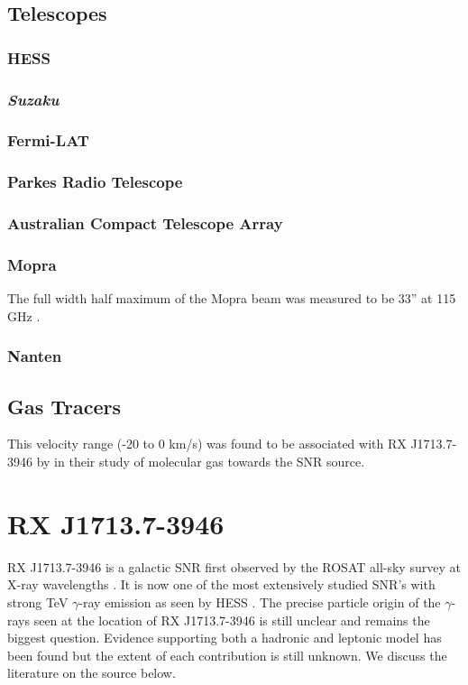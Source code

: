\documentclass[12pt,a4paper]{article}
\begin{document}
\subsection{Telescopes}
\subsubsection{HESS}
\subsubsection{\textbf{\textit{Suzaku}}}
\subsubsection{Fermi-LAT}
\subsubsection{Parkes Radio Telescope}
\subsubsection{Australian Compact Telescope Array}
\subsubsection{Mopra}
The full width half maximum of the Mopra beam was measured to be 33'' at 115 GHz \citep{2005PASA...22...62L}.
\subsubsection{Nanten}

\subsection{Gas Tracers}
This velocity range (-20 to 0 km/s) was found to be associated with RX J1713.7-3946 by \cite{2005ApJ...631..947M} in their study of molecular gas towards the SNR source.

\newpage
\section{RX J1713.7-3946}

RX J1713.7-3946 is a galactic SNR first observed by the ROSAT all-sky survey at X-ray wavelengths \citep{1996rftu.proc..267P}. 
It is now one of the most extensively studied SNR's with strong TeV $\gamma$-ray emission as seen by HESS \citep{2004Natur.432...75A,2018A&A...612A...6H}.
The precise particle origin of the $\gamma$-rays seen at the location of RX J1713.7-3946 is still unclear and remains the biggest question. 
Evidence supporting both a hadronic and leptonic model has been found but the extent of each contribution is still unknown. 
We discuss the literature on the source below.
\end{document}
